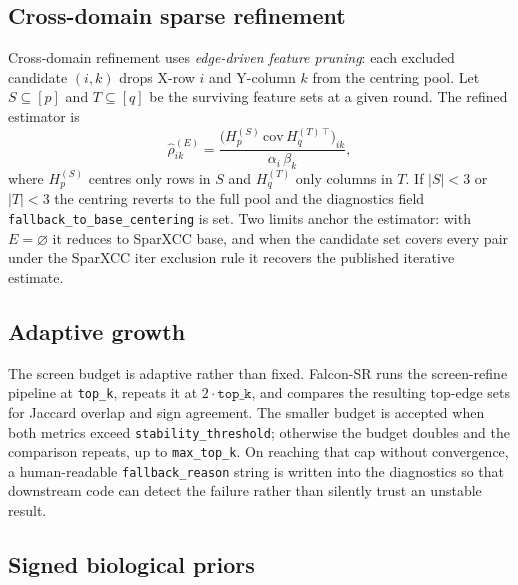 \documentclass[unnumsec,webpdf,contemporary,large]{oup-authoring-template}
\theoremstyle{thmstyleone}
\theoremstyle{thmstyletwo}
\theoremstyle{thmstylethree}
\begin{document}
\subsection{Cross-domain sparse refinement}\label{sec:cross-refine}

Cross-domain refinement uses \emph{edge-driven feature pruning}: each
excluded candidate $(i, k)$ drops X-row $i$ and Y-column $k$ from the
centring pool. Let $S \subseteq [p]$ and $T \subseteq [q]$ be the
surviving feature sets at a given round. The refined estimator is
\begin{equation}
\hat\rho_{ik}^{(E)} =
\frac{\bigl(H_p^{(S)}\,\mathrm{cov}\,H_q^{(T)\,\top}\bigr)_{ik}}
     {\alpha_i\,\beta_k},
\label{eq:cross-refine}
\end{equation}
where $H_p^{(S)}$ centres only rows in $S$ and $H_q^{(T)}$ only columns
in $T$. If $|S| < 3$ or $|T| < 3$ the centring reverts to the full pool
and the diagnostics field \texttt{fallback\_to\_base\_centering} is
set. Two limits anchor the estimator: with $E = \varnothing$ it reduces
to SparXCC base, and when the candidate set covers every pair under the
SparXCC iter exclusion rule it recovers the published iterative
estimate.

\subsection{Adaptive growth}\label{sec:growth}

The screen budget is adaptive rather than fixed. Falcon-SR runs the
screen-refine pipeline at \texttt{top\_k}, repeats it at
$2 \cdot \texttt{top\_k}$, and compares the resulting top-edge sets for
Jaccard overlap and sign agreement. The smaller budget is accepted when
both metrics exceed \texttt{stability\_threshold}; otherwise the
budget doubles and the comparison repeats, up to \texttt{max\_top\_k}.
On reaching that cap without convergence, a human-readable
\texttt{fallback\_reason} string is written into the diagnostics so
that downstream code can detect the failure rather than silently trust
an unstable result.

\subsection{Signed biological priors}\label{sec:priors}
\end{document}
